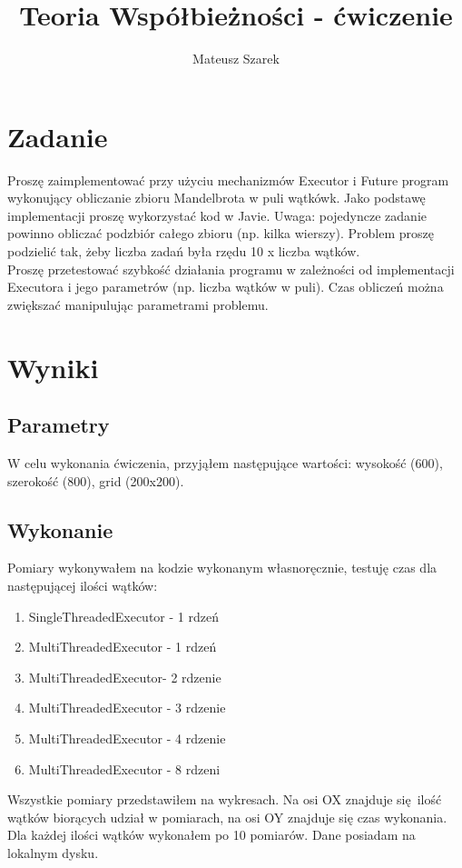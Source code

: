 \documentclass[a4paper,10pt]{article}
\title{Teoria Współbieżności - ćwiczenie}
\author{Mateusz Szarek}
\date{}
\begin{document}
\maketitle

\section{Zadanie}
Proszę zaimplementować przy użyciu mechanizmów Executor i Future program wykonujący obliczanie zbioru Mandelbrota w puli wątkówk. Jako podstawę implementacji proszę wykorzystać kod w Javie. Uwaga: pojedyncze zadanie powinno obliczać podzbiór całego zbioru (np. kilka wierszy). Problem proszę podzielić tak, żeby liczba zadań była rzędu 10 x liczba wątków.\\
Proszę przetestować szybkość działania programu w zależności od implementacji Executora i jego parametrów (np. liczba wątków w puli). Czas obliczeń można zwiększać manipulując parametrami problemu.

\section{Wyniki}

\subsection*{Parametry}

W celu wykonania ćwiczenia, przyjąłem następujące wartości: wysokość (600), szerokość (800), grid (200x200).

\subsection*{Wykonanie}

Pomiary wykonywałem na kodzie wykonanym własnoręcznie, testuję czas dla następującej ilości wątków:
\begin{enumerate}
 \item SingleThreadedExecutor - 1 rdzeń
 \item MultiThreadedExecutor - 1 rdzeń
 \item MultiThreadedExecutor- 2 rdzenie
 \item MultiThreadedExecutor - 3 rdzenie
 \item MultiThreadedExecutor - 4 rdzenie
 \item MultiThreadedExecutor - 8 rdzeni
\end{enumerate}
Wszystkie pomiary przedstawiłem na wykresach. Na osi OX znajduje się ilość wątków biorących udział w pomiarach, na osi OY znajduje się czas wykonania. Dla każdej ilości wątków wykonałem po 10 pomiarów. Dane posiadam na lokalnym dysku.
\end{document}
